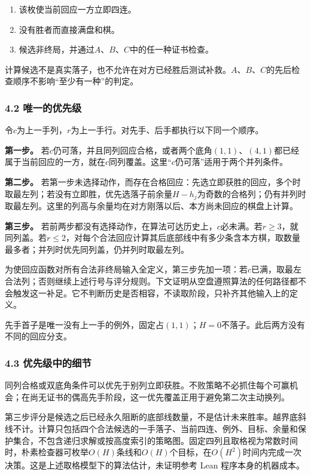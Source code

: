 \documentclass[
  a4paper,
]{article}
\providecommand{\tightlist}{%
  \setlength{\itemsep}{0pt}\setlength{\parskip}{0pt}}
\begin{document}
\begin{enumerate}
\def\labelenumi{\arabic{enumi}.}
\tightlist
\item
  该枚使当前回应一方立即四连。
\item
  没有胜者而直接满盘和棋。
\item
  候选非终局，并通过\(A\)、\(B\)、\(C\)中的任一种证书检查。
\end{enumerate}

计算候选不是真实落子，也不允许在对方已经胜后测试补救。\(A\)、\(B\)、\(C\)的先后检查顺序不影响``至少有一种''的判定。

\subsubsection{4.2
唯一的优先级}\label{ux552fux4e00ux7684ux4f18ux5148ux7ea7}

令\(c\)为上一手列，\(r\)为上一手行。对先手、后手都执行以下同一个顺序。

\textbf{第一步。}
若\(c\)仍可落，并且同列回应合格，或者两个底角\((1,1)\)、\((4,1)\)都已经属于当前回应的一方，就在\(c\)同列覆盖。这里``\(c\)仍可落''适用于两个并列条件。

\textbf{第二步。}
若第一步未选择动作，而存在合格回应：先选立即获胜的回应，多个时取最左列；若没有立即胜，优先选落子前余量\(H-h_j\)为奇数的合格列；仍有并列时取最左列。这里的列高与余量均在对方刚落以后、本方尚未回应的棋盘上计算。

\textbf{第三步。}
若前两步都没有选择动作，在算法可达历史上，\(c\)必未满。若\(r\ge 3\)，就同列盖。若\(r\le 2\)，对每个合法回应计算其后底部线中有多少条含本方棋，取数量最多者；并列时优先同列盖，仍并列时取最左列。

为使回应函数对所有合法非终局输入全定义，第三步先加一项：若\(c\)已满，取最左合法列；否则继续上述行号与评分规则。下文证明从空盘遵照算法的任何路径都不会触发这一补足。它不判断历史是否相容，不读取阶段，只补齐其他输入上的定义。

先手首子是唯一没有上一手的例外，固定占\((1,1)\)；\(H=0\)不落子。此后两方没有不同的回应分支。

\subsubsection{4.3
优先级中的细节}\label{ux4f18ux5148ux7ea7ux4e2dux7684ux7ec6ux8282}

同列合格或双底角条件可以优先于别列立即获胜。不败策略不必抓住每个可赢机会；在尚无证书的偶高先手阶段，这一优先覆盖正用于避免第二次主动换列。

第三步评分是候选之后已经永久阻断的底部线数量，不是估计未来胜率。越界底斜线不计。计算只包括四个合法候选的一手落子、当前四连、例外、目标、余量和保护集合，不包含递归求解或按高度索引的策略图。固定四列且取格视为常数时间时，朴素检查器可枚举\(O(H)\)条线和\(O(H)\)个目标，在\(O(H^2)\)时间内完成一次决策。这是上述取格模型下的算法估计，未证明参考
Lean 程序本身的机器成本。
\end{document}
